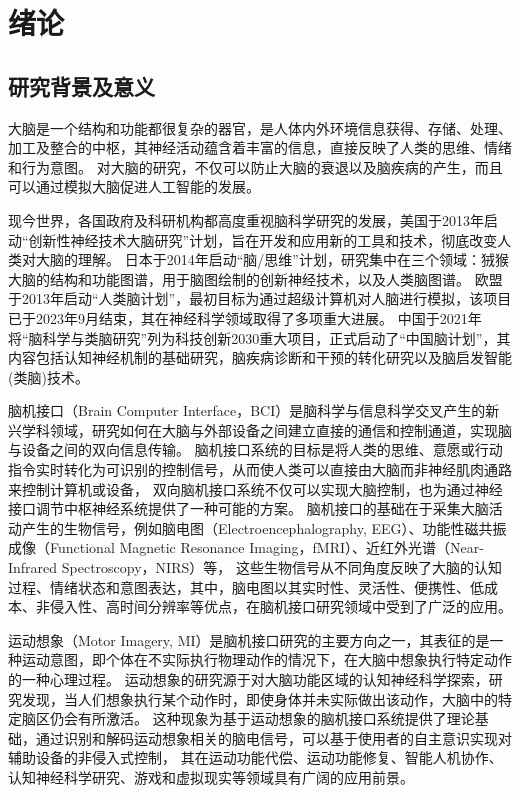 
\chapter{绪论}

\section{研究背景及意义}

大脑是一个结构和功能都很复杂的器官，是人体内外环境信息获得、存储、处理、加工及整合的中枢\cite{LXTX201902004}，其神经活动蕴含着丰富的信息，直接反映了人类的思维、情绪和行为意图。
对大脑的研究，不仅可以防止大脑的衰退以及脑疾病的产生，而且可以通过模拟大脑促进人工智能的发展\cite{KYYX201907013}。

现今世界，各国政府及科研机构都高度重视脑科学研究的发展，美国于2013年启动“创新性神经技术大脑研究”计划，旨在开发和应用新的工具和技术，彻底改变人类对大脑的理解\cite{jorgenson2015brain}。
日本于2014年启动“脑/思维”计划，研究集中在三个领域：狨猴大脑的结构和功能图谱，用于脑图绘制的创新神经技术，以及人类脑图谱\cite{okano2015brain}。
欧盟于2013年启动“人类脑计划”，最初目标为通过超级计算机对人脑进行模拟，该项目已于2023年9月结束，其在神经科学领域取得了多项重大进展\cite{naddaf2023europe}。
中国于2021年将“脑科学与类脑研究”列为科技创新2030重大项目\cite{china2021brain}，正式启动了“中国脑计划”，其内容包括认知神经机制的基础研究，脑疾病诊断和干预的转化研究以及脑启发智能(类脑)技术\cite{POO2016591}。

脑机接口（Brain Computer Interface，BCI）是脑科学与信息科学交叉产生的新兴学科领域，研究如何在大脑与外部设备之间建立直接的通信和控制通道，实现脑与设备之间的双向信息传输。
脑机接口系统的目标是将人类的思维、意愿或行动指令实时转化为可识别的控制信号，从而使人类可以直接由大脑而非神经肌肉通路来控制计算机或设备，
双向脑机接口系统不仅可以实现大脑控制，也为通过神经接口调节中枢神经系统提供了一种可能的方案\cite{he2020brain}。
脑机接口的基础在于采集大脑活动产生的生物信号，例如脑电图（Electroencephalography, EEG）、功能性磁共振成像（Functional Magnetic Resonance Imaging，fMRI）、近红外光谱（Near-Infrared Spectroscopy，NIRS）等，
这些生物信号从不同角度反映了大脑的认知过程、情绪状态和意图表达，其中，脑电图以其实时性、灵活性、便携性、低成本、非侵入性、高时间分辨率等优点，在脑机接口研究领域中受到了广泛的应用。

运动想象（Motor Imagery, MI）是脑机接口研究的主要方向之一，其表征的是一种运动意图，即个体在不实际执行物理动作的情况下，在大脑中想象执行特定动作的一种心理过程。
运动想象的研究源于对大脑功能区域的认知神经科学探索，研究发现，当人们想象执行某个动作时，即使身体并未实际做出该动作，大脑中的特定脑区仍会有所激活。
这种现象为基于运动想象的脑机接口系统提供了理论基础，通过识别和解码运动想象相关的脑电信号，可以基于使用者的自主意识实现对辅助设备的非侵入式控制，
其在运动功能代偿、运动功能修复\cite{pichiorri2015brain}、智能人机协作、认知神经科学研究、游戏和虚拟现实等领域具有广阔的应用前景。

